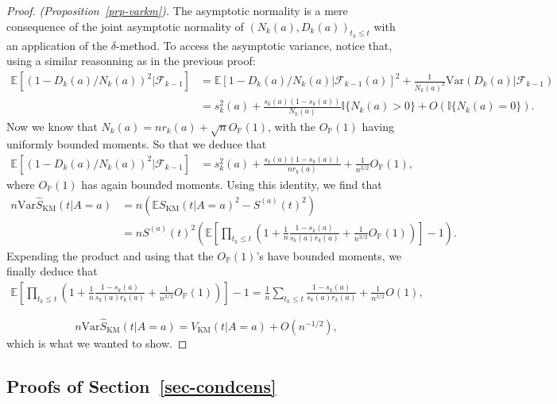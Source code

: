 \documentclass[
  11pt,
  a4paper,
]{article}
\theoremstyle{plain}
\theoremstyle{plain}
\theoremstyle{plain}
\theoremstyle{definition}
\theoremstyle{remark}
\begin{document}
\begin{proof}
\emph{(Proposition~\ref{prp-varkm}).} The asymptotic normality is a mere
consequence of the joint asymptotic normality of
\((N_k(a),D_k(a))_{t_k \leqslant t}\) with an application of the
\(\delta\)-method. To access the asymptotic variance, notice that, using
a similar reasonning as in the previous proof: \begin{align*}
\mathbb{E}[(1-D_k(a)/N_k(a))^2|\mathcal{F}_{k-1}] &= \mathbb{E}[1-D_k(a)/N_k(a)|\mathcal{F}_{k-1}(a)]^2+\frac{1}{N_k(a)^2}\mathrm{Var}(D_k(a)|\mathcal{F}_{k-1}) \\
&= s_k^2(a)+ \frac{s_k(a)(1-s_k(a))}{N_k(a)}\mathbb{I}\{N_k(a) > 0\} + O(\mathbb{I}\{N_k(a) = 0\}). 
\end{align*} Now we know that
\(N_k(a) = n r_k(a) + \sqrt{n} O_{\mathbb{P}}(1)\), with the
\(O_{\mathbb{P}}(1)\) having uniformly bounded moments. So that we
deduce that \[
\begin{aligned}
\mathbb{E}[(1-D_k(a)/N_k(a))^2|\mathcal{F}_{k-1}] &= s_k^2(a)+ \frac{s_k(a)(1-s_k(a))}{n r_k(a)} +  \frac{1}{n^{3/2}} O_{\mathbb{P}}(1), 
\end{aligned}
\] where \(O_{\mathbb{P}}(1)\) has again bounded moments. Using this
identity, we find that \[
\begin{aligned}
n \mathrm{Var}\widehat S_{\mathrm{KM}} (t|A=a) &= n \left(\mathbb{E}S_{\mathrm{KM}} (t|A=a)^2 -  S^{(a)} (t)^2 \right) \\
&= n S^{(a)}(t)^2 \left(\mathbb{E}\left[\prod_{t_k \leqslant t}  \left(1+\frac1n\frac{1-s_k(a)}{s_k(a) r_k(a)} +   \frac{1}{n^{3/2}} O_{\mathbb{P}}(1) \right)\right]-1\right).
\end{aligned}
\] Expending the product and using that the \(O_{\mathbb{P}}(1)\)'s have
bounded moments, we finally deduce that \[
\begin{aligned}
\mathbb{E}\left[\prod_{t_k \leqslant t}  \left(1+\frac1n\frac{1-s_k(a)}{s_k(a) r_k(a)} +   \frac{1}{n^{3/2}} O_{\mathbb{P}}(1) \right)\right]-1 =   \frac1n \sum_{t_k \leqslant t}\frac{1-s_k(a)}{s_k(a) r_k(a)} +   \frac{1}{n^{3/2}} O(1),
\end{aligned}
\]

\[
n\mathrm{Var}\widehat S_{\mathrm{KM}} (t|A=a) = V_{\mathrm{KM}}(t|A=a) + O(n^{-1/2}),  
\] which is what we wanted to show.
\end{proof}

\subsection{\texorpdfstring{Proofs of
Section~\ref{sec-condcens}}{Proofs of Section~}}\label{sec-proof22}
\end{document}
